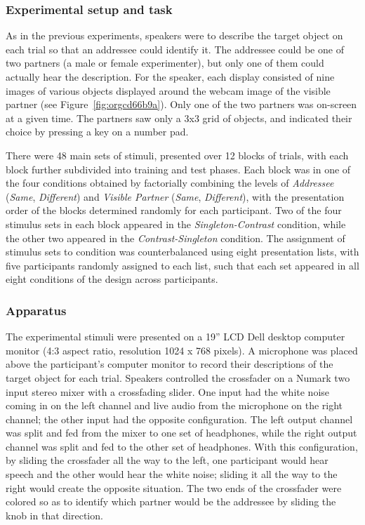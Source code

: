 \documentclass[natbib,doc,a4paper]{apa6}
\begin{document}
\subsubsection*{Experimental setup and task}
\label{sec:org49bbb86}

As in the previous experiments, speakers were to describe the target object on each trial so that an addressee could identify it. The addressee could be one of two partners (a male or female experimenter), but only one of them could actually hear the description. For the speaker, each display consisted of nine images of various objects displayed around the webcam image of the visible partner (see Figure~\ref{fig:orgcd66b9a}). Only one of the two partners was on-screen at a given time.  The partners saw only a 3x3 grid of objects, and indicated their choice by pressing a key on a number pad.

There were 48 main sets of stimuli, presented over 12 blocks of trials, with each block further subdivided into training and test phases. Each block was in one of the four conditions obtained by factorially combining the levels of \emph{Addressee} (\emph{Same}, \emph{Different}) and \emph{Visible Partner} (\emph{Same}, \emph{Different}), with the presentation order of the blocks determined randomly for each participant.  Two of the four stimulus sets in each block appeared in the \emph{Singleton-Contrast} condition, while the other two appeared in the \emph{Contrast-Singleton} condition.  The assignment of stimulus sets to condition was counterbalanced using eight presentation lists, with five participants randomly assigned to each list, such that each set appeared in all eight conditions of the design across participants.

\subsubsection*{Apparatus}
\label{sec:org40be20a}

The experimental stimuli were presented on a 19'' LCD Dell desktop computer monitor (4:3 aspect ratio, resolution 1024 x 768 pixels). A microphone was placed above the participant's computer monitor to record their descriptions of the target object for each trial. Speakers controlled the crossfader on a Numark two input stereo mixer with a crossfading slider. One input had the white noise coming in on the left channel and live audio from the microphone on the right channel; the other input had the opposite configuration.  The left output channel was split and fed from the mixer to one set of headphones, while the right output channel was split and fed to the other set of headphones.  With this configuration, by sliding the crossfader all the way to the left, one participant would hear speech and the other would hear the white noise; sliding it all the way to the right would create the opposite situation.  The two ends of the crossfader were colored so as to identify which partner would be the addressee by sliding the knob in that direction.
\end{document}
